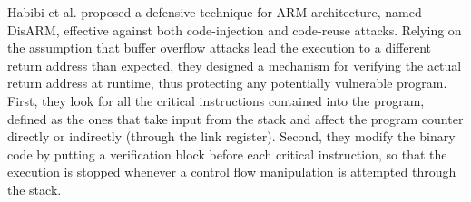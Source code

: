 Habibi et al. \cite{disarm} proposed a defensive technique for ARM architecture, named DisARM, effective against both code-injection and code-reuse attacks.
Relying on the assumption that buffer overflow attacks lead the execution to a different return address than expected,
they designed a mechanism for verifying the actual return address at runtime, thus protecting any potentially vulnerable program.
First, they look for all the critical instructions contained into the program, defined as the ones that take input from the stack
and affect the program counter directly or indirectly (\eg through the link register).
Second, they modify the binary code by putting a verification block before each critical instruction,
so that the execution is stopped whenever a control flow manipulation is attempted through the stack.

